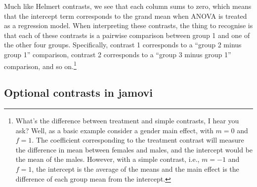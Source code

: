 \documentclass[
  a4paper,
]{book}
\begin{document}
Much like Helmert contrasts, we see that each column sums to zero, which
means that the intercept term corresponds to the grand mean when ANOVA
is treated as a regression model. When interpreting these contrasts, the
thing to recognise is that each of these contrasts is a pairwise
comparison between group 1 and one of the other four groups.
Specifically, contrast 1 corresponds to a ``group 2 minus group 1''
comparison, contrast 2 corresponds to a ``group 3 minus group 1''
comparison, and so on.\footnote{What's the difference between treatment
  and simple contrasts, I hear you ask? Well, as a basic example
  consider a gender main effect, with \(m=0\) and \(f=1\). The
  coefficient corresponding to the treatment contrast will measure the
  difference in mean between females and males, and the intercept would
  be the mean of the males. However, with a simple contrast, i.e.,
  \(m=-1\) and \(f=1\), the intercept is the average of the means and
  the main effect is the difference of each group mean from the
  intercept.}

\hypertarget{optional-contrasts-in-jamovi}{%
\subsection{Optional contrasts in
jamovi}\label{optional-contrasts-in-jamovi}}

\hypertarget{tbl-tab14-15}{}
 
  \providecommand{\huxb}[2]{\arrayrulecolor[RGB]{#1}\global\arrayrulewidth=#2pt}
  \providecommand{\huxvb}[2]{\color[RGB]{#1}\vrule width #2pt}
  \providecommand{\huxtpad}[1]{\rule{0pt}{#1}}
  \providecommand{\huxbpad}[1]{\rule[-#1]{0pt}{#1}}
\end{document}
